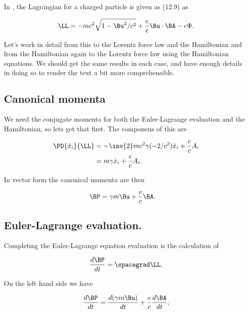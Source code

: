 In \cite{jackson1975cew}, the Lagrangian for a charged particle is given as (12.9) as 

\begin{align}\label{eqn:hamiltonian:em1}
\LL = -m c^2 \sqrt{1 - \Bu^2/c^2} + \frac{e}{c} \Bu \cdot \BA - e \Phi.
\end{align}

Let's work in detail from this to the Lorentz force law and the Hamiltonian and from the Hamiltonian again to the Lorentz force law using the Hamiltonian equations.  We should get the same results in each case, and have enough details in doing so to render the text a bit more comprehensible.

\subsection{Canonical momenta}

We need the conjugate momenta for both the Euler-Lagrange evaluation and the Hamiltonian, so lets get that first.  The componens of this are

\begin{align*}
\PD{\dot{x}_i}{\LL} 
&= - \inv{2} m c^2 \gamma (-2/c^2) \dot{x}_i + \frac{e}{c} A_i \\
&= m \gamma \dot{x}_i + \frac{e}{c} A_i.
\end{align*}

In vector form the canonical momenta are then

\begin{align}\label{eqn:hamiltonian:em2}
\BP &= \gamma m \Bu + \frac{e}{c} \BA.
\end{align}

\subsection{Euler-Lagrange evaluation.}

Completing the Euler-Lagrange equation evaluation is the calculation of

\begin{align}\label{eqn:hamiltonian:em2b}
\frac{d\BP}{dt} = \spacegrad \LL.
\end{align}

On the left hand side we have

\begin{align}\label{eqn:hamiltonian:em2l}
\frac{d\BP}{dt} = \frac{d(\gamma m \Bu)}{dt} + \frac{e}{c} \frac{d\BA }{dt},
\end{align}

